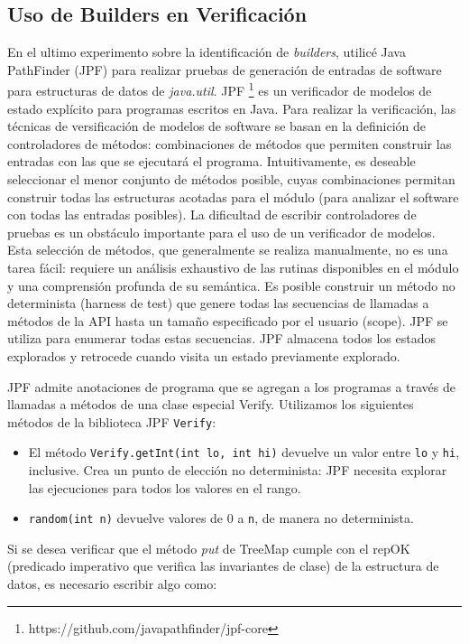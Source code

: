 \subsection{Uso de Builders en Verificación}

En el ultimo experimento sobre la identificación de \emph{builders}, utilicé Java PathFinder \cite{Visser:2005} (JPF) para realizar pruebas de generación de entradas de software para estructuras de datos de \emph{java.util}. JPF \footnote{https://github.com/javapathfinder/jpf-core}  es un verificador de modelos de estado explícito para programas escritos en Java. Para realizar la verificación, las técnicas de versificación de modelos de software se basan en la definición de controladores de métodos: combinaciones de métodos que permiten construir las entradas con las que se ejecutará el programa. Intuitivamente, es deseable seleccionar el menor conjunto de métodos posible, cuyas combinaciones permitan construir todas las estructuras acotadas para el módulo (para analizar el software con todas las entradas posibles). La dificultad de escribir controladores de pruebas es un obstáculo importante para el uso de un verificador de modelos. Esta selección de métodos, que generalmente se realiza manualmente, no es una tarea fácil: requiere un análisis exhaustivo de las rutinas disponibles en el módulo y una comprensión profunda de su semántica.
Es posible construir un método no determinista (harness de test) que genere todas las secuencias de llamadas a métodos de la API hasta un tamaño especificado por el usuario (scope). JPF se utiliza para enumerar todas estas secuencias. JPF almacena todos los estados explorados y retrocede cuando visita un estado previamente explorado.

JPF admite anotaciones de programa que se agregan a los programas a través de llamadas a métodos de una clase especial Verify.
Utilizamos los siguientes métodos de la biblioteca JPF \verb"Verify":
\\
\begin{itemize}
\item El método \verb"Verify.getInt(int lo, int hi)" devuelve un valor entre \verb"lo" y \verb"hi", inclusive. Crea un punto de elección no determinista: JPF necesita explorar las ejecuciones para todos los valores en el rango.
\item \verb"random(int n)" devuelve valores de 0 a \verb"n", de manera no determinista.
\end{itemize}

Si se desea verificar que el método \emph{put}  de TreeMap cumple con el repOK (predicado imperativo que verifica las invariantes de clase) de la estructura de datos, es necesario escribir algo como: 
\\

